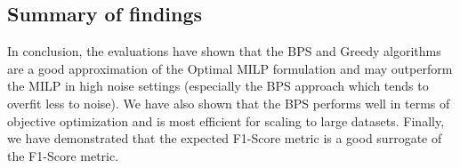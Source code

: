 






\subsection{Summary of findings}
In conclusion, the evaluations have shown that the BPS and Greedy algorithms are a good approximation of the Optimal MILP formulation and may outperform the MILP in high noise settings (especially the BPS approach which tends to overfit  less to noise). We have also shown that the BPS performs well in terms of objective optimization and is most efficient for scaling to large datasets. Finally, we have demonstrated that the expected F1-Score metric is a good surrogate of the F1-Score metric.

























